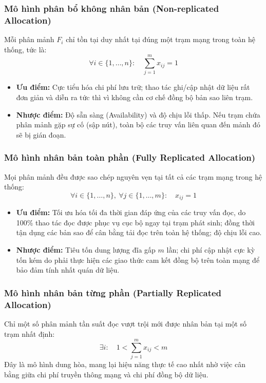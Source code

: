 \documentclass[12pt,a4paper]{report}
\begin{document}
\subsubsection{Mô hình phân bổ không nhân bản (Non-replicated Allocation)}
Mỗi phân mảnh $F_i$ chỉ tồn tại duy nhất tại đúng một trạm mạng trong toàn hệ thống, tức là:
\[
\forall i \in \{1, \dots, n\}: \quad \sum_{j=1}^{m} x_{ij} = 1
\]
\begin{itemize}[leftmargin=0.8cm, topsep=1pt, itemsep=1pt]
    \item \textbf{Ưu điểm:} Cực tiểu hóa chi phí lưu trữ; thao tác ghi/cập nhật dữ liệu rất đơn giản và diễn ra tức thì vì không cần cơ chế đồng bộ bản sao liên trạm.
    \item \textbf{Nhược điểm:} Độ sẵn sàng (Availability) và độ chịu lỗi thấp. Nếu trạm chứa phân mảnh gặp sự cố (sập nút), toàn bộ các truy vấn liên quan đến mảnh đó sẽ bị gián đoạn.
\end{itemize}

\subsubsection{Mô hình nhân bản toàn phần (Fully Replicated Allocation)}
Mọi phân mảnh đều được sao chép nguyên vẹn tại tất cả các trạm mạng trong hệ thống:
\[
\forall i \in \{1, \dots, n\}, \ \forall j \in \{1, \dots, m\}: \quad x_{ij} = 1
\]
\begin{itemize}[leftmargin=0.8cm, topsep=1pt, itemsep=1pt]
    \item \textbf{Ưu điểm:} Tối ưu hóa tối đa thời gian đáp ứng của các truy vấn đọc, do 100\% thao tác đọc được phục vụ cục bộ ngay tại trạm phát sinh; đồng thời tận dụng các bản sao để cân bằng tải đọc trên toàn hệ thống; độ chịu lỗi cao.
    \item \textbf{Nhược điểm:} Tiêu tốn dung lượng đĩa gấp $m$ lần; chi phí cập nhật cực kỳ tốn kém do phải thực hiện các giao thức cam kết đồng bộ trên toàn mạng để bảo đảm tính nhất quán dữ liệu.
\end{itemize}

\subsubsection{Mô hình nhân bản từng phần (Partially Replicated Allocation)}
Chỉ một số phân mảnh tần suất đọc vượt trội mới được nhân bản tại một số trạm nhất định:
\[
\exists i: \quad 1 < \sum_{j=1}^{m} x_{ij} < m
\]
Đây là mô hình dung hòa, mang lại hiệu năng thực tế cao nhất nhờ việc cân bằng giữa chi phí truyền thông mạng và chi phí đồng bộ dữ liệu.
\end{document}

